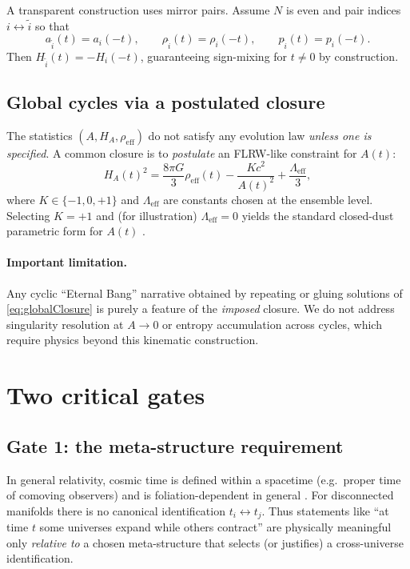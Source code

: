 \documentclass[11pt]{article}
\begin{document}
A transparent construction uses mirror pairs. Assume $N$ is even and pair indices $i\leftrightarrow \tilde i$ so that
\begin{equation}
a_{\tilde i}(t)=a_i(-t),\qquad \rho_{\tilde i}(t)=\rho_i(-t),\qquad p_{\tilde i}(t)=p_i(-t).
\end{equation}
Then $H_{\tilde i}(t)=-H_i(-t)$, guaranteeing sign-mixing for $t\neq 0$ by construction.

\subsection{Global cycles via a postulated closure}

The statistics $(A,H_A,\rho_{\mathrm{eff}})$ do not satisfy any evolution law \emph{unless one is specified}. A common closure is to \emph{postulate} an FLRW-like constraint for $A(t)$:
\begin{equation}
H_A(t)^2 = \frac{8\pi G}{3}\rho_{\mathrm{eff}}(t) - \frac{Kc^2}{A(t)^2} + \frac{\Lambda_{\mathrm{eff}}}{3},
\label{eq:globalClosure}
\end{equation}
where $K\in\{-1,0,+1\}$ and $\Lambda_{\mathrm{eff}}$ are constants chosen at the ensemble level.
Selecting $K=+1$ and (for illustration) $\Lambda_{\mathrm{eff}}=0$ yields the standard closed-dust parametric form for $A(t)$ \citep{Dodelson2003,Mukhanov2005}.

\paragraph{Important limitation.}
Any cyclic ``Eternal Bang'' narrative obtained by repeating or gluing solutions of \eqref{eq:globalClosure} is purely a feature of the \emph{imposed} closure. We do not address singularity resolution at $A\to0$ or entropy accumulation across cycles, which require physics beyond this kinematic construction.

\section{Two critical gates}

\subsection{Gate 1: the meta-structure requirement}

In general relativity, cosmic time is defined within a spacetime (e.g.\ proper time of comoving observers) and is foliation-dependent in general \citep{Wald1984}. For disconnected manifolds there is no canonical identification $t_i\leftrightarrow t_j$.
Thus statements like ``at time $t$ some universes expand while others contract'' are physically meaningful only \emph{relative to} a chosen meta-structure that selects (or justifies) a cross-universe identification.
\end{document}

